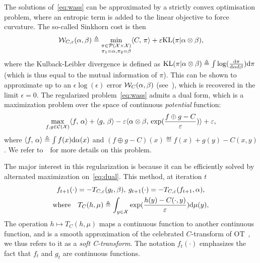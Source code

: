 The solutions of~\eqref{eq:wass} can be approximated by a strictly convex optimisation problem, where an entropic term is added to the linear objective to force curvature. The so-called Sinkhorn cost is then
\begin{equation}\label{eq:wass}
    \mathcal{W}_{C,\varepsilon}(\alpha, \beta) \triangleq 
    \min_{
    \substack{
        \pi \in \mathcal{P}(\mathcal{X} \times \mathcal{X})
        \\\pi_1 = \alpha, \pi_2 = \beta
    }    
    } \langle C,\,\pi\rangle + \varepsilon \textrm{KL}(\pi | \alpha \otimes \beta),
\end{equation}
where the Kulback-Leibler divergence is defined as $\textrm{KL}(\pi | \alpha \otimes \beta) \triangleq \int \log(\frac{\textrm{d}\pi}{\textrm{d}\alpha\textrm{d}\beta}) \textrm{d}\pi$ (which is thus equal to the mutual information of $\pi$).
%
This can be shown to approximate up to an $\epsilon \log(\epsilon)$ error $\mathcal{W}_C(\alpha,\beta)$ (see~\cite{2019-Genevay-aistats}), which is recovered in the limit $\epsilon=0$. 
%
The regularized problem~\eqref{eq:wass} admits a dual form, which is a maximization problem over the space of continuous \textit{potential} function:
\begin{equation}\label{eq:dual}
    \max_{f, g \in \mathcal{C}(\mathcal{X})} \langle f,\,\alpha\rangle + \langle g,\,\beta\rangle
    - \varepsilon \langle \alpha \otimes \beta,\,\exp(\frac{f \oplus g - C}{\varepsilon})\rangle + \varepsilon, 
\end{equation}
where $\langle f,\,\alpha\rangle \triangleq \int f(x) \textrm{d}\alpha(x)$ and $(f \oplus g - C)(x) \eqdef f(x)+g(y)-C(x,y)$.
%
We refer to~\cite{peyre2019computational} for more details on this problem.

The major interest in this regularization is because it can be efficiently solved by alternated maximization on~\eqref{eq:dual}. This method, at iteration $t$
\begin{gather}\label{eq:sinkhorn}
    f_{t+1}(\cdot) = - T_{C,\varepsilon}(g_t, \beta), \:
    g_{t+1}(\cdot) = - T_{C,\varepsilon}(f_{t+1}, \alpha), \\
    \text{where} \quad 
    T_C(h, \mu) \triangleq \int_{y \in \mathcal{X}} \exp(\frac{h(y) - C(\cdot, y)}{\varepsilon})\textrm{d} \mu(y),
\end{gather}
The operation $h \mapsto T_C(h, \mu)$  maps a continuous function to another continuous function, and is a smooth approximation of the celebrated $C$-transform of OT~\cite{santambrogio2015optimal}, we thus refers to it as a \textit{soft C-transform}. 
%
The notation $f_t(\cdot)$ emphasizes the fact that $f_t$ and $g_t$ are continuous functions. 
%

